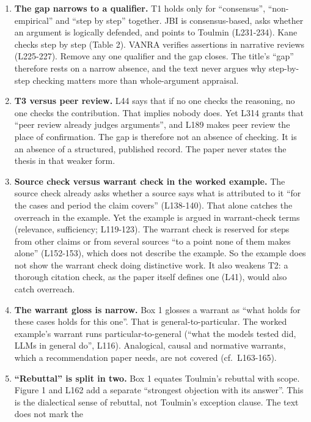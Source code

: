 {\begin{enumerate}
\def\labelenumi{\arabic{enumi}.}
\tightlist
\item
  \textbf{The gap narrows to a qualifier.} T1 holds only for
  ``consensus'', ``non-empirical'' and ``step by step'' together. JBI is
  consensus-based, asks whether an argument is logically defended, and
  points to Toulmin (L231-234). Kane checks step by step (Table 2).
  VANRA verifies assertions in narrative reviews (L225-227). Remove any
  one qualifier and the gap closes. The title's ``gap'' therefore rests
  on a narrow absence, and the text never argues why step-by-step
  checking matters more than whole-argument appraisal.
\item
  \textbf{T3 versus peer review.} L44 says that if no one checks the
  reasoning, no one checks the contribution. That implies nobody does.
  Yet L314 grants that ``peer review already judges arguments'', and
  L189 makes peer review the place of confirmation. The gap is therefore
  not an absence of checking. It is an absence of a structured,
  published record. The paper never states the thesis in that weaker
  form.
\item
  \textbf{Source check versus warrant check in the worked example.} The
  source check already asks whether a source says what is attributed to
  it ``for the cases and period the claim covers'' (L138-140). That
  alone catches the overreach in the example. Yet the example is argued
  in warrant-check terms (relevance, sufficiency; L119-123). The warrant
  check is reserved for steps from other claims or from several sources
  ``to a point none of them makes alone'' (L152-153), which does not
  describe the example. So the example does not show the warrant check
  doing distinctive work. It also weakens T2: a thorough citation check,
  as the paper itself defines one (L41), would also catch overreach.
\item
  \textbf{The warrant gloss is narrow.} Box 1 glosses a warrant as
  ``what holds for these cases holds for this one''. That is
  general-to-particular. The worked example's warrant runs
  particular-to-general (``what the models tested did, LLMs in general
  do'', L116). Analogical, causal and normative warrants, which a
  recommendation paper needs, are not covered (cf.~L163-165).
\item
  \textbf{``Rebuttal'' is split in two.} Box 1 equates Toulmin's
  rebuttal with scope. Figure 1 and L162 add a separate ``strongest
  objection with its answer''. This is the dialectical sense of
  rebuttal, not Toulmin's exception clause. The text does not mark the

\end{enumerate}}
